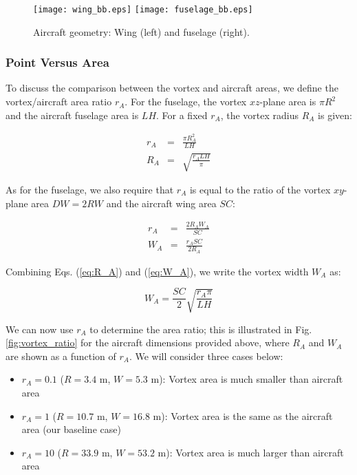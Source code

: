 \documentclass[smallextended]{svjour3}       %
\begin{document}
\begin{figure}
\texttt{[image: wing\_bb.eps]}
\texttt{[image: fuselage\_bb.eps]}
\caption{Aircraft geometry: Wing (left) and fuselage (right).}
\label{fig:aircraft_wing_fuselage}
\end{figure}

\subsubsection{Point Versus Area}
\label{subsubsec:p_vs_a}

To discuss the comparison between the vortex and aircraft areas, we define the vortex/aircraft area ratio $r_A$. For the fuselage, the vortex $xz$-plane area is $\pi R^2$ and the aircraft fuselage area is $LH$. For a fixed $r_A$, the vortex radius $R_A$ is given:

\begin{eqnarray}
r_A &=& \frac{\pi R_A^2}{LH} \\
R_A &=& \sqrt{\frac{r_A L H}{\pi}}
\label{eq:R_A}
\end{eqnarray}

As for the fuselage, we also require that $r_A$ is equal to the ratio of the vortex $xy$-plane area $DW=2RW$ and the aircraft wing area $SC$:

\begin{eqnarray}
  r_A &=& \frac{2 R_A W_A}{S C} \\
  W_A &=& \frac{r_A S C}{2 R_A}
  \label{eq:W_A}
\end{eqnarray}

Combining Eqs. (\ref{eq:R_A}) and (\ref{eq:W_A}), we write the vortex width $W_A$ as:

\begin{equation}
  W_A = \frac{S C}{2} \sqrt{\frac{r_A \pi}{L H}}
\end{equation}

We can now use $r_A$ to determine the area ratio; this is illustrated in Fig. \ref{fig:vortex_ratio} for the aircraft dimensions provided above, where $R_A$ and $W_A$ are shown as a function of $r_A$. We will consider three cases below:

\begin{itemize}
  \item $r_A=0.1$ ($R=3.4$ m, $W=5.3$ m): Vortex area is much smaller than aircraft area
  \item $r_A=1$ ($R=10.7$ m, $W=16.8$ m): Vortex area is the same as the aircraft area (our baseline case)
  \item $r_A=10$ ($R=33.9$ m, $W=53.2$ m): Vortex area is much larger than aircraft area
\end{itemize}
\end{document}
